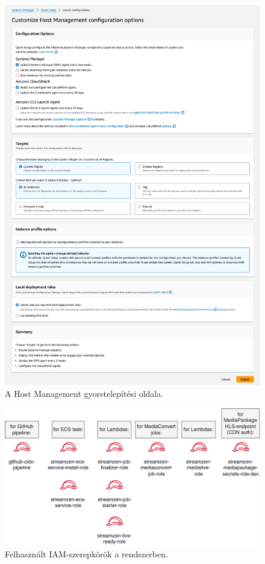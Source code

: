 \begin{figure}[ht]
  \centering
  \includegraphics[width=152mm, keepaspectratio]{figures/hostmgmt.png}
  \caption{A Host Management gyorstelepítési oldala.}
  \label{fig:hostmgmt}
\end{figure}

\begin{figure}[ht]
  \centering
  \includegraphics[width=150mm, keepaspectratio]{figures/server_roles.png}
  \caption{Felhasznált IAM-szerepkörök a rendszerben.}
  \label{fig:roles}
\end{figure}


